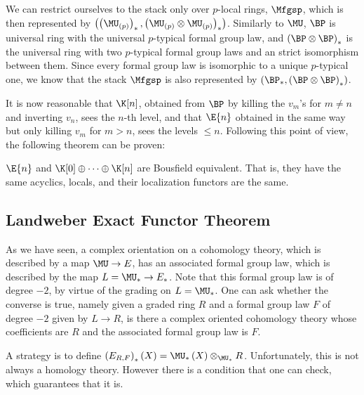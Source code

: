 We can restrict ourselves to the stack only over $p$-local rings, $\Mfgsp$, which is then represented by $\left(\left(\MU_{\left(p\right)}\right)_*, \left(\MU_{\left(p\right)} \otimes \MU_{\left(p\right)}\right)_*\right)$.
Similarly to $\MU$, $\BP$ is universal ring with the universal $p$-typical formal group law, and $\left(\BP \otimes \BP\right)_*$ is the universal ring with two $p$-typical formal group laws and an strict isomorphism between them.
Since every formal group law is isomorphic to a unique $p$-typical one, we know that the stack $\Mfgsp$ is also represented by $\left(\BP_*, \left(\BP \otimes \BP\right)_*\right)$.

It is now reasonable that $\K[n]$, obtained from $\BP$ by killing the $v_m$'s for $m \neq n$ and inverting $v_n$, sees the $n$-th level, and that $\E{n}$ obtained in the same way but only killing $v_m$ for $m > n$, sees the levels $\leq n$.
Following this point of view, the following theorem can be proven:

\begin{theorem}
	$\E{n}$ and $\K[0] \oplus \cdots \oplus \K[n]$ are Bousfield equivalent.
	That is, they have the same acyclics, locals, and their localization functors are the same.
\end{theorem}




\subsection{Landweber Exact Functor Theorem}

As we have seen, a complex orientation on a cohomology theory, which is described by a map $\MU \to E$, has an associated formal group law, which is described by the map $L = \MU_* \to E_*$.
Note that this formal group law is of degree $-2$, by virtue of the grading on $L = \MU_*$.
One can ask whether the converse is true, namely given a graded ring $R$ and a formal group law $F$ of degree $-2$ given by $L \to R$, is there a complex oriented cohomology theory whose coefficients are $R$ and the associated formal group law is $F$.

A strategy is to define $\left(E_{R,F}\right)_*\left(X\right) = \MU_*\left(X\right) \otimes_{\MU_*} R$.
Unfortunately, this is not always a homology theory.
However there is a condition that one can check, which guarantees that it is.

